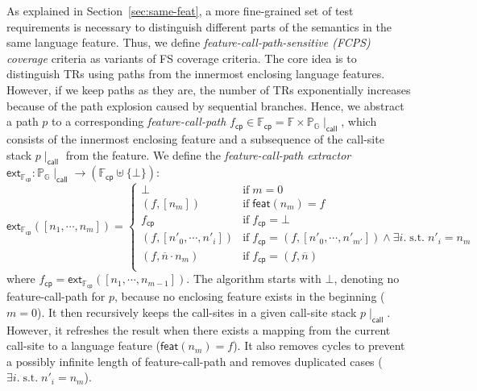 \documentclass[acmsmall,review,screen]{acmart}
\newcommand{\tif}{\text{if} \; }
\newcommand{\tst}{{\; \text{s.t.} \; }}
\newcommand{\name}[1]{\textsf{#1}}
\newcommand{\graph}{\mathbb{G}}
\newcommand{\node}{n}
\newcommand{\nodes}{\overline{\node}}
\newcommand{\patset}[1]{\mathbb{P}_{#1}}
\newcommand{\pat}{p}
\newcommand{\featset}{\mathbb{F}}
\newcommand{\feat}{f}
\newcommand{\featmap}{\name{feat}}
\newcommand{\css}[1]{{#1}\!\mid_{\name{call}}}
\newcommand{\fcpset}{\featset_\name{cp}}
\newcommand{\fcp}{\feat_\name{cp}}
\newcommand{\extfcp}{\name{ext}_{\fcpset}}
\begin{document}
As explained in Section~\ref{sec:same-feat}, a more fine-grained set of test
requirements is necessary to distinguish different parts of the semantics
in the same language feature.
Thus, we define \textit{feature-call-path-sensitive (FCPS)
coverage} criteria as variants of FS coverage criteria.
%
The core idea is to distinguish TRs using paths from the innermost enclosing language
features.
%
However, if we keep paths as they are, the number of TRs exponentially increases
because of the path explosion caused by sequential branches.
%
Hence, we abstract a path $\pat$ to a corresponding \textit{feature-call-path}
$\fcp \in \fcpset = \featset \times \css{\patset{\graph}}$, which consists of
the innermost enclosing feature and a subsequence of the call-site stack $\css{\pat}$
from the feature.
%
We define the \textit{feature-call-path extractor} $\extfcp:
\css{\patset{\graph}} \rightarrow (\fcpset \uplus \{ \bot \})$:
%
\begin{equation}\label{equ:extfcp}
  \extfcp([\node_1, \cdots, \node_m]) = \left\{
    \begin{array}{ll}
      \bot & \tif m = 0\\

      (\feat, [\node_m]) & \tif \featmap(\node_m) = \feat\\

      \fcp & \tif \fcp = \bot\\

      (\feat, [\node'_0, \cdots, \node'_i]) &
      \tif \fcp = (\feat, [\node'_0, \cdots, \node'_{m'}]) \wedge
      \exists i. \tst \node'_i = \node_m\\

      (\feat, \nodes \cdot \node_m) & \tif \fcp = (\feat, \nodes)\\
    \end{array}
  \right.
\end{equation}
%
where $\fcp = \extfcp([\node_1, \cdots, \node_{m-1}])$.
%
The algorithm starts with $\bot$, denoting no feature-call-path
for $\pat$, because no enclosing feature exists in the beginning ($m = 0$).
%
It then recursively keeps the call-sites in a given call-site
stack $\css{\pat}$.
%
However, it refreshes the result when there exists a mapping from the current
call-site to a language feature ($\featmap(\node_m) = \feat$).
%
It also removes cycles to prevent a possibly infinite
length of feature-call-path and removes duplicated cases ($\exists i. \tst
\node'_i = \node_m$).

\end{document}
